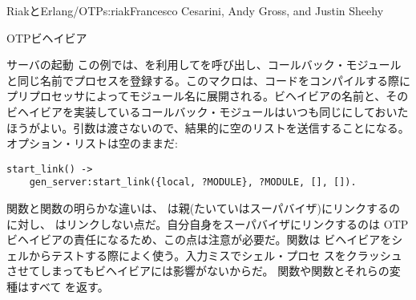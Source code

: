 \begin{aosachapter}{RiakとErlang/OTP}{s:riak}{Francesco Cesarini, Andy Gross, and Justin Sheehy}
\begin{aosasect1}{OTPビヘイビア}
\begin{aosasect2}{サーバの起動}
この例では、を利用してを呼び出し、コールバック・モジュールと同じ名前でプロセスを登録する。このマクロは、コードをコンパイルする際にプリプロセッサによってモジュール名に展開される。ビヘイビアの名前と、そのビヘイビアを実装しているコールバック・モジュールはいつも同じにしておいたほうがよい。引数は渡さないので、結果的に空のリストを送信することになる。オプション・リストは空のままだ:

\begin{verbatim}
start_link() ->
    gen_server:start_link({local, ?MODULE}, ?MODULE, [], []).
\end{verbatim}


\noindent {}関数と関数の明らかな違いは、
は親(たいていはスーパバイザ)にリンクするのに対し、
はリンクしない点だ。自分自身をスーパバイザにリンクするのは
OTPビヘイビアの責任になるため、この点は注意が必要だ。関数は
ビヘイビアをシェルからテストする際によく使う。入力ミスでシェル・プロセ
スをクラッシュさせてしまってもビヘイビアには影響がないからだ。
関数や関数とそれらの変種はすべて
を返す。



\end{aosasect2}
\end{aosasect1}
\end{aosachapter}
